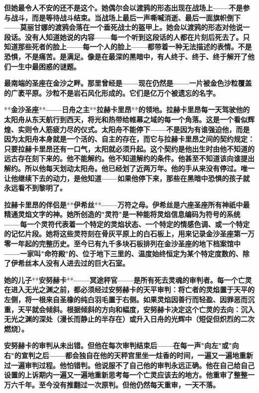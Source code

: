 \documentclass[12pt,a4paper,openany]{ctexbook}
\begin{document}
\textbf{但她最令人不安的还不是这个。她偶尔会以渡鸦的形态出现在战场上——不是参与战斗，而是等待战斗结束。当战场上最后一声嘶喊消逝、最后一面旗帜倒下——莫丽甘娜的渡鸦会落在一个垂死战士的盔甲上。她会以渡鸦的形态对他说一段话。没有人知道她说的内容——每一个听到这段话的人都在片刻后死去了。只知道那些死者的脸上——每一个人的脸上——都带着一种无法描述的表情。不是恐惧，不是痛苦。是满足。像是在最深的黑暗中，有人终于、终于、终于解开了他们一生中最困惑的谜题。}


\textbf{最南端的圣座在金沙之畔。那里曾经是——现在仍然是——一片被金色沙粒覆盖的广袤平原。沙粒不是岩石风化形成的。它们是亿万个被遗忘的名字。}


**\textbf{金沙圣座}**\textbf{——日舟之主}**\textbf{拉赫卡里昂}**\textbf{的领地。拉赫卡里昂每一天驾驶他的太阳舟从东天航行到西天，将光和热带给帷幕之域的每一个角落。这是一个看似辉煌、实则令人筋疲力尽的仪式。太阳舟不能停下——不是因为有谁强迫他，而是因为太阳舟本身就是一个活的、自主的存在，而它与拉赫卡里昂之间的契约规定：只要拉赫卡里昂还有一口气，太阳就必须升起。这个契约是他出生时由他不知道的远古存在刻下来的。他不能解约。他不知道解约的条件。他甚至不知道该向谁提出解约。所以他每天划动太阳舟。他已经划了近两万年。他的手从来没有停过。唯一让他继续下去的动力，是他知道——如果他停下来，那些在黑暗中恐惧的孩子就永远看不到黎明了。}


\textbf{拉赫卡里昂的伴侣是}**\textbf{伊希丝}**\textbf{——万符之母。伊希丝是六座圣座所有神祇中最精通灵焰文字的神。她所创造的"灵符"是一种能将灵焰信息编码为符号的系统——每一个灵符代表着一个特定的灵焰状态、一个特定的情感色调、或一个特定的记忆片段。她将这些灵符刻在骨灰平原上的白石板上，用来记录金沙圣座第一万零一年起的完整历史。至今已有九千多块石板排列在金沙圣座的地下档案馆中——一家叫"命符殿"的、位于地下三里的、温度始终恒定为某个特定度数的、除了伊希丝本人没有人进去过的巨大石室。}


\textbf{她的儿子}**\textbf{安努赫卡}**\textbf{——冥途秤官——是所有死去灵魂的审判者。每一个亡灵在进入无光之渊之前，都必须经过安努赫卡的天平审判：将亡者的灵焰置于天平的左侧，将一根来自圣橡的纯白羽毛置于右侧。如果灵焰因善行而轻盈、因罪恶而沉重，天平就会倾斜。根据倾斜的方向和幅度，安努赫卡决定这个亡灵的去向：沉入无光之渊的深处（漫长而静止的半存在）或升入日舟的光辉中（短促但炽烈的二次燃烧）。}


\textbf{安努赫卡的审判从未出错。但他在每次审判结束后——在每一声"向左"或"向右"的宣判之后——都会独自在他的天秤宫里坐一炷香的时间，一遍又一遍地重新过一遍审判过程。他怕错判。他说服不了自己他的审判永远正确。他在自己给自己设置的上诉期内一遍又一遍地重新思考每一个亡灵应该去的地方。他重审了整整一万六千年。至今没有推翻过一次原判。但他仍然每天重审，一天不落。}
\end{document}
